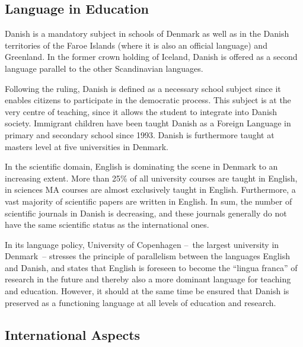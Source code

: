 \documentclass[]{../../metanetpaper}
\begin{document}
\begin{multicols}{2}
\subsection{Language in Education}

Danish is a mandatory subject in schools of Denmark as well as in the Danish territories of the Faroe Islands (where it is also an official language) and Greenland. In the former crown holding of Iceland, Danish is offered as a second language parallel to the other Scandinavian languages.

Following the ruling, Danish is defined as a necessary school subject since it enables citizens to participate in the democratic process. This subject is at the very centre of teaching, since it allows the student to integrate into Danish society. Immigrant children have been taught Danish as a Foreign Language in primary and secondary school since 1993. Danish is furthermore taught at masters level at five universities in Denmark. 

In the scientific domain, English is dominating the scene in Denmark to an increasing extent. More than 25\% of all university courses are taught in English, in sciences MA courses are almost exclusively taught in English. Furthermore, a vast majority of scientific papers are written in English. In sum, the number of scientific journals in Danish is decreasing, and these journals generally do not have the same scientific status as the international ones.


In its language policy, University of Copenhagen --~the largest university in Denmark~-- stresses the principle of parallelism between the languages English and Danish, and states that English is foreseen to become the ``lingua franca'' of research in the future and thereby also a more dominant language for teaching and education. However, it should at the same time be ensured that Danish is preserved as a functioning language at all levels of education and research.

\subsection{International Aspects}


\end{multicols}
\end{document}
